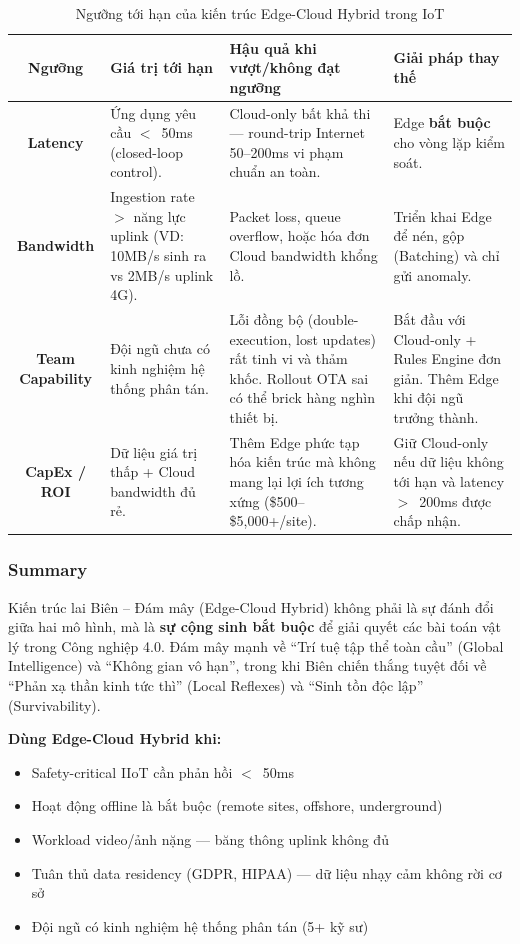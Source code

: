 \begin{table}[H]
\centering
\caption{Ngưỡng tới hạn của kiến trúc Edge-Cloud Hybrid trong IoT}
\begin{tabularx}{\textwidth}{c X X X}
\toprule
\textbf{Ngưỡng} & \textbf{Giá trị tới hạn} & \textbf{Hậu quả khi vượt/không đạt ngưỡng} & \textbf{Giải pháp thay thế} \\
\hline
\textbf{Latency}
  & Ứng dụng yêu cầu $<$~50ms (closed-loop control).
  & Cloud-only bất khả thi --- round-trip Internet 50--200ms vi phạm chuẩn an toàn.
  & Edge \textbf{bắt buộc} cho vòng lặp kiểm soát. \\
\hline
\textbf{Bandwidth}
  & Ingestion rate $>$ năng lực uplink (VD: 10MB/s sinh ra vs 2MB/s uplink 4G).
  & Packet loss, queue overflow, hoặc hóa đơn Cloud bandwidth khổng lồ.
  & Triển khai Edge để nén, gộp (Batching) và chỉ gửi anomaly. \\
\hline
\textbf{Team Capability}
  & Đội ngũ chưa có kinh nghiệm hệ thống phân tán.
  & Lỗi đồng bộ (double-execution, lost updates) rất tinh vi và thảm khốc. Rollout OTA sai có thể brick hàng nghìn thiết bị.
  & Bắt đầu với Cloud-only + Rules Engine đơn giản. Thêm Edge khi đội ngũ trưởng thành. \\
\hline
\textbf{CapEx / ROI}
  & Dữ liệu giá trị thấp + Cloud bandwidth đủ rẻ.
  & Thêm Edge phức tạp hóa kiến trúc mà không mang lại lợi ích tương xứng (\$500--\$5,000+/site).
  & Giữ Cloud-only nếu dữ liệu không tới hạn và latency $>$~200ms được chấp nhận. \\
\hline
\end{tabularx}
\end{table}

\subsubsection{Summary}
\label{subsec:edge-cloud-summary}

Kiến trúc lai Biên -- Đám mây (Edge-Cloud Hybrid) không phải là sự đánh đổi giữa hai mô hình, mà là \textbf{sự cộng sinh bắt buộc} để giải quyết các bài toán vật lý trong Công nghiệp 4.0. Đám mây mạnh về ``Trí tuệ tập thể toàn cầu'' (Global Intelligence) và ``Không gian vô hạn'', trong khi Biên chiến thắng tuyệt đối về ``Phản xạ thần kinh tức thì'' (Local Reflexes) và ``Sinh tồn độc lập'' (Survivability).

\noindent\textbf{Dùng Edge-Cloud Hybrid khi:}
\begin{itemize}
    \item Safety-critical IIoT cần phản hồi $<$~50ms
    \item Hoạt động offline là bắt buộc (remote sites, offshore, underground)
    \item Workload video/ảnh nặng --- băng thông uplink không đủ
    \item Tuân thủ data residency (GDPR, HIPAA) --- dữ liệu nhạy cảm không rời cơ sở
    \item Đội ngũ có kinh nghiệm hệ thống phân tán (5+ kỹ sư)
\end{itemize}

